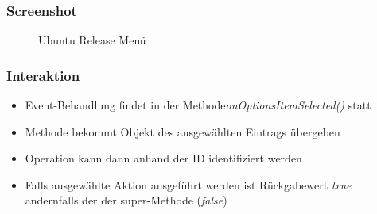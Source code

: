 \begin{frame}
   \frametitle{Screenshot}
   \begin{figure}[h!]
     \centering
     \hfill
     \caption{
        Ubuntu Release Menü
     }
   \end{figure}
\end{frame}

\begin{frame}
   \frametitle{Interaktion}
   \begin{itemize}
      \item Event-Behandlung findet in der Methode\emph{onOptionsItemSelected()} statt
      \item Methode bekommt Objekt des ausgewählten Eintrags übergeben
      \item Operation kann dann anhand der ID identifiziert werden
      \item Falls ausgewählte Aktion ausgeführt werden ist Rückgabewert \emph{true} 
         andernfalls der der super-Methode (\emph{false})
   \end{itemize}

   
\end{frame}

